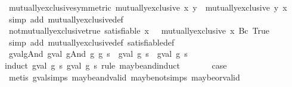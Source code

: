 \begin{isabellebody}
\endisatagproof
{\isafoldproof}%
%
\isadelimproof
\isanewline
%
\endisadelimproof
\isanewline
{}\isamarkupfalse%
\ mutually{\isacharunderscore}exclusive{\isacharunderscore}symmetric{\isacharcolon}\ {\isachardoublequoteopen}mutually{\isacharunderscore}exclusive\ x\ y\ {\isasymLongrightarrow}\ mutually{\isacharunderscore}exclusive\ y\ x{\isachardoublequoteclose}\isanewline
%
\isadelimproof
\ \ %
\endisadelimproof
%
\isatagproof
{}\isamarkupfalse%
\ {\isacharparenleft}simp\ add{\isacharcolon}\ mutually{\isacharunderscore}exclusive{\isacharunderscore}def{\isacharparenright}%
\endisatagproof
{\isafoldproof}%
%
\isadelimproof
\isanewline
%
\endisadelimproof
\isanewline
{}\isamarkupfalse%
\ not{\isacharunderscore}mutually{\isacharunderscore}exclusive{\isacharunderscore}true{\isacharcolon}\ {\isachardoublequoteopen}satisfiable\ x\ {\isacharequal}\ {\isacharparenleft}{\isasymnot}\ mutually{\isacharunderscore}exclusive\ x\ {\isacharparenleft}Bc\ True{\isacharparenright}{\isacharparenright}{\isachardoublequoteclose}\isanewline
%
\isadelimproof
\ \ %
\endisadelimproof
%
\isatagproof
{}\isamarkupfalse%
\ {\isacharparenleft}simp\ add{\isacharcolon}\ mutually{\isacharunderscore}exclusive{\isacharunderscore}def\ satisfiable{\isacharunderscore}def{\isacharparenright}%
\endisatagproof
{\isafoldproof}%
%
\isadelimproof
\isanewline
%
\endisadelimproof
\isanewline
{}\isamarkupfalse%
\ gval{\isacharunderscore}gAnd{\isacharcolon}\ {\isachardoublequoteopen}gval\ {\isacharparenleft}gAnd\ g{}\ g{}{\isacharparenright}\ s\ {\isacharequal}\ {\isacharparenleft}gval\ g{}\ s{\isacharparenright}\ {\isasymand}\isactrlsub {\isacharquery}\ {\isacharparenleft}gval\ g{}\ s{\isacharparenright}{\isachardoublequoteclose}\isanewline
%
\isadelimproof
%
\endisadelimproof
%
\isatagproof
{}\isamarkupfalse%
{\isacharparenleft}induct\ {\isachardoublequoteopen}gval\ g{}\ s{\isachardoublequoteclose}\ {\isachardoublequoteopen}gval\ g{}\ s{\isachardoublequoteclose}\ rule{\isacharcolon}\ maybe{\isacharunderscore}and{\isachardot}induct{\isacharparenright}\isanewline
{}\isamarkupfalse%
\ {}\isanewline
\ \ \isamarkupfalse%
\ \isamarkupfalse%
\ {\isacharquery}case\isanewline
\ \ \ \ \isamarkupfalse%
\ {\isacharparenleft}metis\ gval{\isachardot}simps{\isacharparenleft}{}{\isacharparenright}\ maybe{\isacharunderscore}and{\isacharunderscore}valid\ maybe{\isacharunderscore}not{\isachardot}simps{\isacharparenleft}{}{\isacharparenright}\ maybe{\isacharunderscore}or{\isacharunderscore}valid{\isacharparenright}\isanewline

\end{isabellebody}
